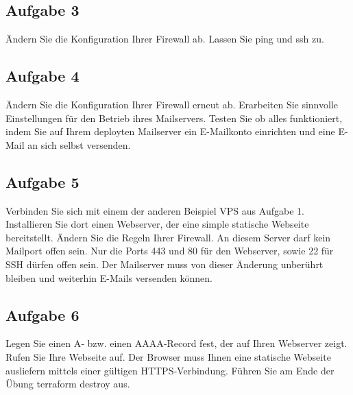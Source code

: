 \documentclass{article}
\begin{document}
    \subsection{Aufgabe 3}
        Ändern Sie die Konfiguration Ihrer Firewall ab. Lassen Sie ping und ssh zu.

    \subsection{Aufgabe 4}
        Ändern Sie die Konfiguration Ihrer Firewall erneut ab. Erarbeiten Sie sinnvolle Einstellungen für den Betrieb ihres Mailservers.
        Testen Sie ob alles funktioniert, indem Sie auf Ihrem deployten Mailserver ein E-Mailkonto einrichten und eine E-Mail an sich selbst versenden.

    \subsection{Aufgabe 5}
        Verbinden Sie sich mit einem der anderen Beispiel VPS aus Aufgabe 1. Installieren Sie dort einen Webserver, der eine simple statische Webseite bereitstellt.
        Ändern Sie die Regeln Ihrer Firewall. An diesem Server darf kein Mailport offen sein. Nur die Ports 443 und 80 für den Webserver, sowie 22 für SSH dürfen offen sein.
        Der Mailserver muss von dieser Änderung unberührt bleiben und weiterhin E-Mails versenden können.
    
    \subsection{Aufgabe 6}
        Legen Sie einen A‑ bzw. einen AAAA‑Record fest, der auf Ihren Webserver zeigt. Rufen Sie Ihre Webseite auf. Der Browser muss Ihnen eine statische Webseite ausliefern mittels einer gültigen HTTPS‑Verbindung.
        Führen Sie am Ende der Übung terraform destroy aus.
\end{document}
